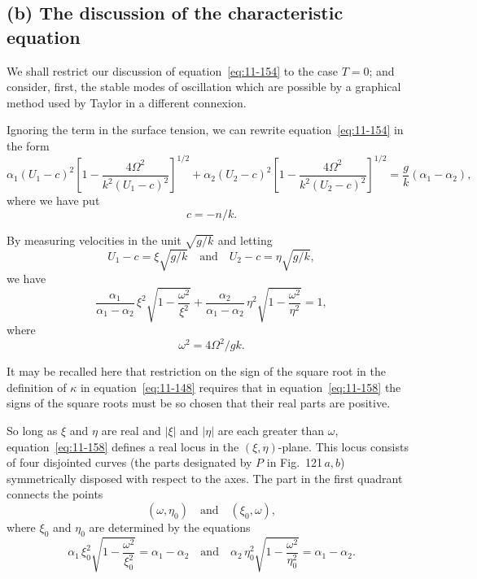 \subsection*{(b) The discussion of the characteristic equation}

We shall restrict our discussion of equation~\eqref{eq:11-154} to the case $T = 0$; and consider, first, the stable modes of oscillation which are possible by a graphical method used by Taylor in a different connexion.

Ignoring the term in the surface tension, we can rewrite equation~\eqref{eq:11-154} in the form
\begin{equation}
\label{eq:11-155}
\alpha_1(U_1-c)^2\!\left[1-\frac{4\Omega^2}{k^2(U_1-c)^2}\right]^{1/2}+\alpha_2(U_2-c)^2\!\left[1-\frac{4\Omega^2}{k^2(U_2-c)^2}\right]^{1/2} = \frac{g}{k}(\alpha_1-\alpha_2),
\end{equation}
where we have put
\begin{equation}
\label{eq:11-156}
c = -n/k.
\end{equation}

By measuring velocities in the unit $\sqrt{g/k}$ and letting
\begin{equation}
\label{eq:11-157}
U_1-c = \xi\sqrt{g/k} \quad\text{and}\quad U_2-c = \eta\sqrt{g/k},
\end{equation}
we have
\begin{equation}
\label{eq:11-158}
\frac{\alpha_1}{\alpha_1-\alpha_2}\,\xi^2\sqrt{1-\frac{\omega^2}{\xi^2}}+\frac{\alpha_2}{\alpha_1-\alpha_2}\,\eta^2\sqrt{1-\frac{\omega^2}{\eta^2}} = 1,
\end{equation}
where
\begin{equation}
\label{eq:11-159}
\omega^2 = 4\Omega^2/gk.
\end{equation}

It may be recalled here that restriction on the sign of the square root in the definition of $\kappa$ in equation~\eqref{eq:11-148} requires that in equation~\eqref{eq:11-158} the signs of the square roots must be so chosen that their real parts are positive.

So long as $\xi$ and $\eta$ are real and $|\xi|$ and $|\eta|$ are each greater than $\omega$, equation~\eqref{eq:11-158} defines a real locus in the $(\xi,\eta)$-plane. This locus consists of four disjointed curves (the parts designated by $P$ in Fig.~121\,$a,b$) symmetrically disposed with respect to the axes. The part in the first quadrant connects the points
\begin{equation}
\label{eq:11-160}
(\omega,\eta_0) \quad\text{and}\quad (\xi_0,\omega),
\end{equation}
where $\xi_0$ and $\eta_0$ are determined by the equations
\begin{equation}
\label{eq:11-161}
\alpha_1\,\xi_0^2\sqrt{1-\frac{\omega^2}{\xi_0^2}} = \alpha_1-\alpha_2 \quad\text{and}\quad \alpha_2\,\eta_0^2\sqrt{1-\frac{\omega^2}{\eta_0^2}} = \alpha_1-\alpha_2.
\end{equation}


